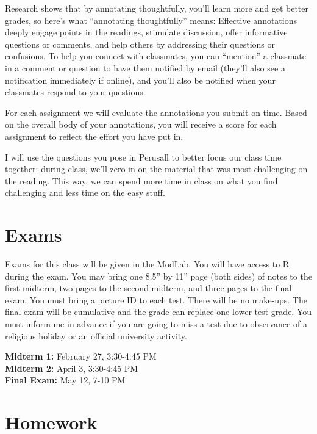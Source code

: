 \documentclass[12pt]{article}
\begin{document}
Research shows that by annotating thoughtfully, you’ll learn more and get better grades, so here’s what ``annotating thoughtfully'' means: Effective annotations deeply engage points in the readings, stimulate discussion, offer informative questions or comments, and help others by addressing their questions or confusions. To help you connect with classmates, you can ``mention'' a classmate in a comment or question to have them notified by email (they’ll also see a notification immediately if online), and you’ll also be notified when your classmates respond to your questions. 

For each assignment we will evaluate the annotations you submit on time. Based on the overall body of your annotations, you will receive a score for each assignment to reflect the effort you have put in.

I will use the questions you pose in Perusall to better focus our class time together: during class, we'll zero in on the material that was most challenging on the reading.  This way, we can spend more time in class on what you find challenging and less time on the easy stuff.

\section*{Exams}

Exams for this class will be given in the ModLab.  You will have access to R during the exam.  You may bring one 8.5'' by 11'' page (both sides) of notes to the first midterm, two pages to the second midterm, and three pages to the final exam.  You must bring a picture ID to each test.  There will be no make-ups.  The final exam will be cumulative and the grade can replace one lower test grade.  You must inform me in advance if you are going to miss a test due to observance of a religious holiday or an official university activity.

\textbf{Midterm 1:} February 27, 3:30-4:45 PM  \\
\textbf{Midterm 2:} April 3, 3:30-4:45 PM  \\
\textbf{Final Exam:} May 12, 7-10 PM \\

\section*{Homework}
\end{document}
